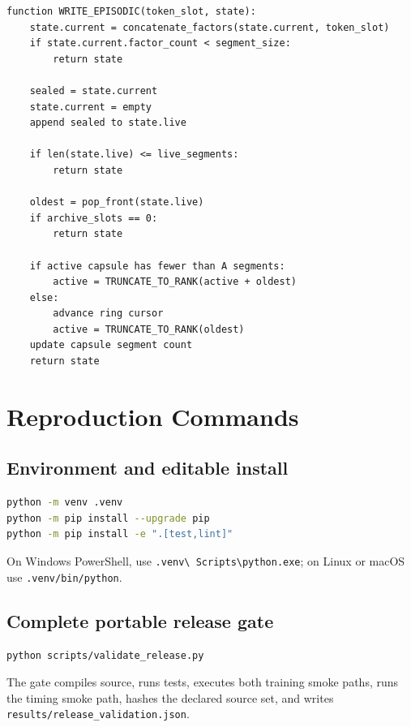 \begin{lstlisting}[caption={Current, live, and archive life cycle.}]
function WRITE_EPISODIC(token_slot, state):
    state.current = concatenate_factors(state.current, token_slot)
    if state.current.factor_count < segment_size:
        return state

    sealed = state.current
    state.current = empty
    append sealed to state.live

    if len(state.live) <= live_segments:
        return state

    oldest = pop_front(state.live)
    if archive_slots == 0:
        return state

    if active capsule has fewer than A segments:
        active = TRUNCATE_TO_RANK(active + oldest)
    else:
        advance ring cursor
        active = TRUNCATE_TO_RANK(oldest)
    update capsule segment count
    return state
\end{lstlisting}

\section{Reproduction Commands}
\label{app:commands}

\subsection{Environment and editable install}

\begin{lstlisting}[language=bash]
python -m venv .venv
python -m pip install --upgrade pip
python -m pip install -e ".[test,lint]"
\end{lstlisting}

On Windows PowerShell, use \texttt{.venv\textbackslash
Scripts\textbackslash python.exe}; on Linux or macOS use
\texttt{.venv/bin/python}.

\subsection{Complete portable release gate}

\begin{lstlisting}[language=bash]
python scripts/validate_release.py
\end{lstlisting}

The gate compiles source, runs tests, executes both training smoke paths, runs
the timing smoke path, hashes the declared source set, and writes
\texttt{results/release\_validation.json}.

